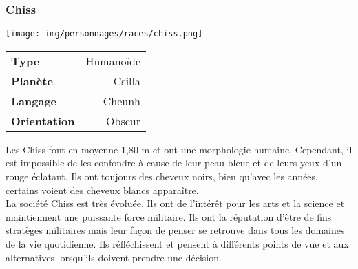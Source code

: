 \subsubsection{Chiss}
\begin{samepage}
	\texttt{[image: img/personnages/races/chiss.png]}

	\vspace{-9\baselineskip}

	\begin{flushright}
		\begin{tabular}{|l|r|}
			\textbf{Type} 			& Humanoïde \\
		   	\textbf{Planète} 		& Csilla \\
		   	\textbf{Langage} 		& Cheunh \\
		   	\textbf{Orientation} 	& Obscur \\
		\end{tabular}
	\end{flushright}
	\vspace{4\baselineskip}
\end{samepage}

Les Chiss font en moyenne 1,80 m et ont une morphologie humaine. Cependant, il est impossible de les confondre à cause de leur peau bleue et de leurs yeux d’un rouge éclatant. Ils ont toujours des cheveux noirs, bien qu’avec les années, certains voient des cheveux blancs apparaître. \\ 

La société Chiss est très évoluée. Ils ont de l’intérêt pour les arts et la science et maintiennent une puissante force militaire. Ils ont la réputation d’être de fins stratèges militaires mais leur façon de penser se retrouve dans tous les domaines de la vie quotidienne. Ils réfléchissent et pensent à différents points de vue et aux alternatives lorsqu’ils doivent prendre une décision.


